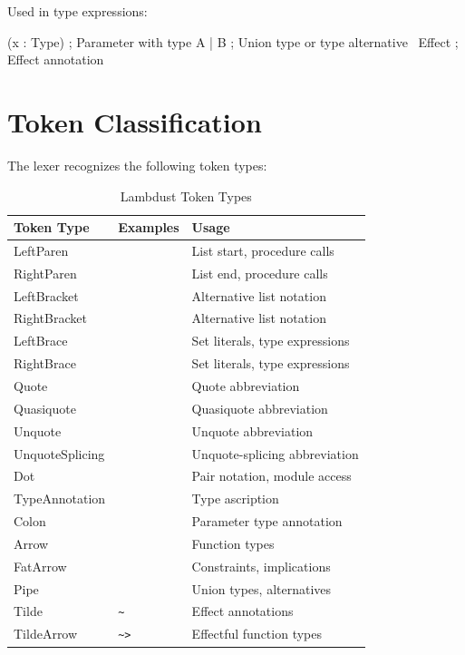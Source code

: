Used in type expressions:
\begin{lambdustcode}
(x : Type)      ; Parameter with type
A | B           ; Union type or type alternative
~Effect         ; Effect annotation
\end{lambdustcode}

\section{Token Classification}
\label{sec:token-classification}

The lexer recognizes the following token types:

\onecolumn
\begin{table}[H]
\centering
\caption{Lambdust Token Types}
\label{tab:tokens}
\begin{tabular}{|l|l|l|}
\hline
\textbf{Token Type} & \textbf{Examples} & \textbf{Usage} \\
\hline
LeftParen & \code{(} & List start, procedure calls \\
RightParen & \code{)} & List end, procedure calls \\
LeftBracket & \code{[} & Alternative list notation \\
RightBracket & \code{]} & Alternative list notation \\
LeftBrace & \code{\{} & Set literals, type expressions \\
RightBrace & \code{\}} & Set literals, type expressions \\
Quote & \code{'} & Quote abbreviation \\
Quasiquote & \code{`} & Quasiquote abbreviation \\
Unquote & \code{,} & Unquote abbreviation \\
UnquoteSplicing & \code{,@} & Unquote-splicing abbreviation \\
Dot & \code{.} & Pair notation, module access \\
TypeAnnotation & \code{::} & Type ascription \\
Colon & \code{:} & Parameter type annotation \\
Arrow & \code{->} & Function types \\
FatArrow & \code{=>} & Constraints, implications \\
Pipe & \code{|} & Union types, alternatives \\
Tilde & \texttt{\textasciitilde} & Effect annotations \\
TildeArrow & \texttt{\textasciitilde>} & Effectful function types \\

\end{tabular}
\end{table}
